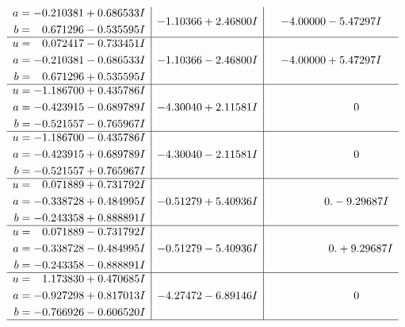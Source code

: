 \documentclass[1p]{elsarticle_modified}
\theoremstyle{definition}
\begin{document}
$$\begin{array}{c|c|c}
\begin{aligned}
a &= -0.210381 + 0.686533 I \\
b &= \phantom{-}0.671296 - 0.535595 I\end{aligned}
 & -1.10366 + 2.46800 I & -4.00000 - 5.47297 I \\ \hline\begin{aligned}
u &= \phantom{-}0.072417 - 0.733451 I \\
a &= -0.210381 - 0.686533 I \\
b &= \phantom{-}0.671296 + 0.535595 I\end{aligned}
 & -1.10366 - 2.46800 I & -4.00000 + 5.47297 I \\ \hline\begin{aligned}
u &= -1.186700 + 0.435786 I \\
a &= -0.423915 - 0.689789 I \\
b &= -0.521557 - 0.765967 I\end{aligned}
 & -4.30040 + 2.11581 I & \phantom{-0.000000 } 0 \\ \hline\begin{aligned}
u &= -1.186700 - 0.435786 I \\
a &= -0.423915 + 0.689789 I \\
b &= -0.521557 + 0.765967 I\end{aligned}
 & -4.30040 - 2.11581 I & \phantom{-0.000000 } 0 \\ \hline\begin{aligned}
u &= \phantom{-}0.071889 + 0.731792 I \\
a &= -0.338728 + 0.484995 I \\
b &= -0.243358 + 0.888891 I\end{aligned}
 & -0.51279 + 5.40936 I & \phantom{-0.000000 } 0. - 9.29687 I \\ \hline\begin{aligned}
u &= \phantom{-}0.071889 - 0.731792 I \\
a &= -0.338728 - 0.484995 I \\
b &= -0.243358 - 0.888891 I\end{aligned}
 & -0.51279 - 5.40936 I & \phantom{-0.000000 -}0. + 9.29687 I \\ \hline\begin{aligned}
u &= \phantom{-}1.173830 + 0.470685 I \\
a &= -0.927298 + 0.817013 I \\
b &= -0.766926 - 0.606520 I\end{aligned}
 & -4.27472 - 6.89146 I & \phantom{-0.000000 } 0\\
 \hline 
 \end{array}$$\newpage$$\begin{array}{c|c|c}  

\end{array}$$
\end{document}
